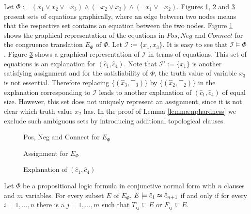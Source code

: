 \begin{example}

Let $\Phi := (x_1 \vee x_2 \vee \neg x_3) \wedge (\neg x_2 \vee x_3) \wedge (\neg x_1 \vee \neg x_2)$. 
Figures \ref{fig:npexamplebig}, \ref{fig:npassignment} and \ref{fig:npexplanation} present sets of equations graphically, where an edge between two nodes means that the respective set contains an equation between the two nodes.
Figure \ref{fig:npexamplebig} shows the graphical representation of the equations in $Pos, Neg$ and $Connect$ for the congruence translation $E_{\Phi}$ of $\Phi$.
Let $\mathcal{I} := \{x_1,x_3\}$. 
It is easy to see that $\mathcal{I} \models \Phi$.
Figure \ref{fig:npexplanation} shows a graphical representation of $\mathcal{I}$ in terms of equations.
This set of equations is an explanation for $(\hat{c}_1,\hat{c}_4)$.
Note that $\mathcal{I}' := \{x_1\}$ is another satisfying assignment and for the satisfiability of $\Phi$, the truth value of variable $x_3$ is not essential.
Therefore replacing $\{(\hat{x}_3,\top_3)\}$ by $\{(\hat{x}_2,\top_2)\}$ in the explanation corresponding to $\mathcal{I}$ leads to another explanation of $(\hat{c}_1,\hat{c}_4)$ of equal size.
However, this set does not uniquely represent an assignment, since it is not clear which truth value $x_2$ has.
In the proof of Lemma \ref{lemma:nphardness} we exclude such ambiguous sets by introducing additional topological clauses.
\begin{figure}[!h]


\caption{Pos, Neg and Connect for $E_{\Phi}$}
\label{fig:npexamplebig}
\end{figure}


\begin{figure}[!h]


\caption{Assignment for $E_{\Phi}$}
\label{fig:npassignment}
\end{figure}

\begin{figure}[!h]


\caption{Explanation of $(\hat{c}_1,\hat{c}_4)$}
\label{fig:npexplanation}
\end{figure}

\end{example}


\begin{lemma}
\label{lemma:charexpl}

Let $\Phi$ be a propositional logic formula in conjunctive normal form with $n$ clauses and $m$ variables.
For every subset $E$ of $E_{\Phi}$, $E \models \hat{c}_1 \thickapprox \hat{c}_{n+1}$ if and only if for every $i = 1,\ldots,n$ there is a $j = 1,\ldots,m$ such that $T_{ij} \subseteq E$ or $F_{ij} \subseteq E$.

\end{lemma}

